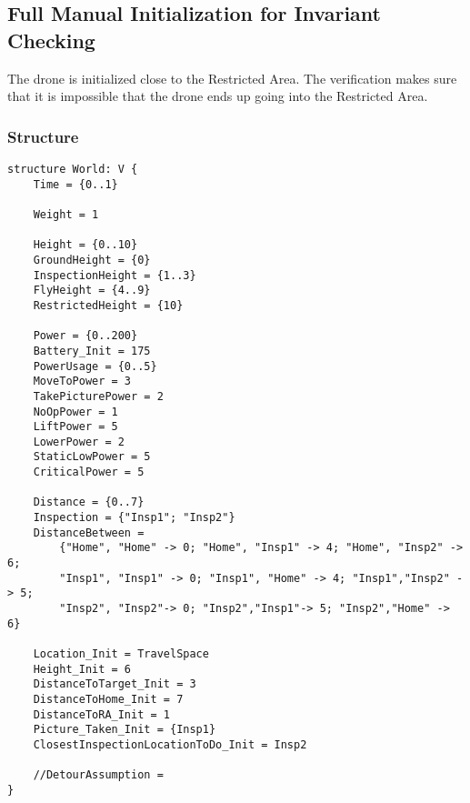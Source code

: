\documentclass[12pt]{extarticle}
\begin{document}
\subsection{Full Manual Initialization for Invariant Checking}
\label{app:manual-init-ic}
The drone is initialized close to the Restricted Area. The verification makes sure that it is impossible that the drone ends up going into the Restricted Area.
\subsubsection*{Structure}
\begin{lstlisting}[basicstyle=\tiny]
structure World: V {
    Time = {0..1}
    
    Weight = 1
    
    Height = {0..10}
    GroundHeight = {0}
    InspectionHeight = {1..3}
    FlyHeight = {4..9}
    RestrictedHeight = {10}
    
    Power = {0..200}
    Battery_Init = 175
    PowerUsage = {0..5}
    MoveToPower = 3
    TakePicturePower = 2
    NoOpPower = 1
    LiftPower = 5
    LowerPower = 2
    StaticLowPower = 5
    CriticalPower = 5
    
    Distance = {0..7}
    Inspection = {"Insp1"; "Insp2"}
    DistanceBetween =
    	{"Home", "Home" -> 0; "Home", "Insp1" -> 4; "Home", "Insp2" -> 6;
        "Insp1", "Insp1" -> 0; "Insp1", "Home" -> 4; "Insp1","Insp2" -> 5;
    	"Insp2", "Insp2"-> 0; "Insp2","Insp1"-> 5; "Insp2","Home" -> 6}
    
    Location_Init = TravelSpace
    Height_Init = 6
    DistanceToTarget_Init = 3
    DistanceToHome_Init = 7
    DistanceToRA_Init = 1
    Picture_Taken_Init = {Insp1}
    ClosestInspectionLocationToDo_Init = Insp2
    
    //DetourAssumption =
}
\end{lstlisting}
\end{document}
